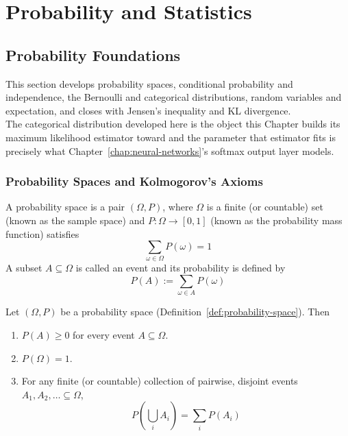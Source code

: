 \chapter{Probability and Statistics}
\label{chap:probability}

\section{Probability Foundations}
\label{sec:probability-foundations}
	
	This section develops probability spaces, conditional probability and independence, the Bernoulli and categorical distributions, random variables and expectation, and closes with Jensen's inequality and KL divergence. \\
	
	The categorical distribution developed here is the object this Chapter builds its maximum likelihood estimator toward and the parameter that estimator fits is precisely what Chapter~\ref{chap:neural-networks}'s softmax output layer models. \\
	
	\subsection{Probability Spaces and Kolmogorov's Axioms}
		
		\begin{definition}
			\label{def:probability-space}
			A probability space is a pair $(\Omega, P)$, where $\Omega$ is a finite (or countable) set (known as the sample space) and $P:\Omega \to [0,1]$ (known as the probability mass function) satisfies
			\[
				\sum_{\omega\in\Omega} P(\omega) = 1
			\]
			A subset $A \subseteq \Omega$ is called an event and its probability is defined by
			\[
				P(A) := \sum_{\omega\in A} P(\omega)
			\]
		\end{definition}
		
		\begin{proposition}
			\label{prop:kolmogorov-axioms}
			Let $(\Omega, P)$ be a probability space (Definition~\ref{def:probability-space}). Then
			\begin{enumerate}[label=($K_\arabic*$)]
				\item \label{ax:K1} $P(A) \ge 0$ for every event $A\subseteq\Omega$.
				\item \label{ax:K2} $P(\Omega) = 1$.
				\item \label{ax:K3} For any finite (or countable) collection of pairwise, disjoint events $A_1, A_2, \dots\subseteq\Omega$,
				\[
					P\left(\bigcup_i A_i\right) = \sum_i P(A_i)
				\]
			\end{enumerate}
		\end{proposition}
		
